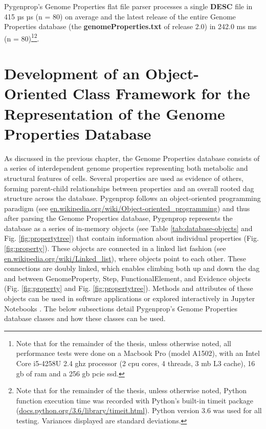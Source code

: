 Pygenprop's Genome Properties flat file parser processes a single \textbf{DESC} 
file in 415 µs  µs (\gls{n} = 80) on average and the latest release of 
the entire Genome Properties database (the \textbf{genomeProperties.txt} of 
release 2.0) in 242.0 ms  ms (\gls{n} = 80)\footnote{Note that for 
the remainder of the thesis, unless otherwise noted, all performance tests were 
done on a Macbook Pro (model A1502), with an Intel Core i5-4258U 2.4 \gls{ghz} 
processor (2 \gls{cpu} cores, 4 threads, 3 \gls{mb} L3 cache), 16 \gls{gb} of 
\gls{ram} and a 256 \gls{gb}  \gls{pcie} \gls{ssd}.}\footnote{Note that for the 
remainder of the thesis, unless otherwise noted, Python function execution time 
was recorded with Python's built-in timeit package 
(\href{http://docs.python.org/3.6/library/timeit.html}{docs.python.org/3.6/library/timeit.html}). 
Python version 3.6 was used for all testing. Variances displayed are standard 
deviations.}.

\section{Development of an Object-Oriented Class Framework for the 
Representation of the Genome Properties Database} \label{genomeprop-oop}

As discussed in the previous chapter, the Genome Properties database consists of 
a series of interdependent genome properties representing both metabolic and 
structural features of cells. Several properties are used as evidence of others, 
forming parent-child relationships between properties and an overall rooted 
\gls{dag} structure across the database. Pygenprop follows an object-oriented 
programming paradigm \cite{booch1986object} (see 
\href{http://en.wikipedia.org/wiki/Object-oriented_programming}{en.wikipedia.org/wiki/Object-oriented\_programming}) 
and thus after parsing the Genome Properties database, Pygenprop represents the 
database as a series of in-memory objects (see Table \ref{tab:database-objects} 
and Fig. \ref{fig:propertytree}) that contain information about individual 
properties (Fig. \ref{fig:property}). These objects are connected in a linked 
list fashion \cite{newell1957programming} (see 
\href{http://en.wikipedia.org/wiki/Linked_list}{en.wikipedia.org/wiki/Linked\_list}), 
where objects point to each other. These connections are doubly linked, which 
enables climbing both up and down the \gls{dag} and between GenomeProperty, 
Step, FunctionalElement, and Evidence objects (Fig. \ref{fig:property} and Fig. 
\ref{fig:propertytree}). Methods and attributes of these objects can be used in 
software applications or explored interactively in Jupyter Notebooks 
\cite{kluyver2016jupyter}. The below subsections detail Pygenprop's Genome 
Properties database classes and how these classes can be used. 

